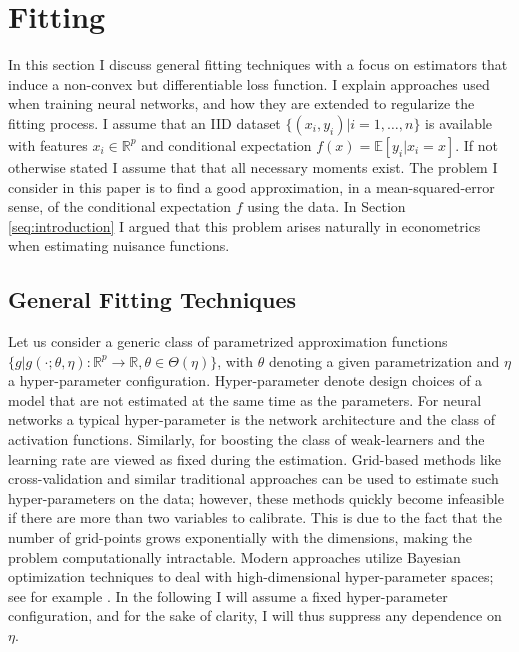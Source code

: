 \section{Fitting}
\label{seq:fitting}

In this section I discuss general fitting techniques with a focus on estimators that
induce a non-convex but differentiable loss function. I explain approaches used when
training neural networks, and how they are extended to regularize the fitting process. I
assume that an IID dataset $\{(x_i, y_i) | i = 1, \dots, n\}$ is available with features
$x_i \in \mathbb{R}^p$ and conditional expectation $f(x) = \mathbb{E}[y_i | x_i = x]$.
If not otherwise stated I assume that that all necessary moments exist. The problem I
consider in this paper is to find a good approximation, in a mean-squared-error sense,
of the conditional expectation $f$ using the data. In Section \ref{seq:introduction} I
argued that this problem arises naturally in econometrics when estimating nuisance
functions.

\subsection{General Fitting Techniques}

Let us consider a generic class of parametrized approximation functions $\{g | g(\cdot;
\theta, \eta) : \mathbb{R}^p \to \mathbb{R}, \theta \in \Theta(\eta)\}$, with $\theta$
denoting a given parametrization and $\eta$ a hyper-parameter configuration.
Hyper-parameter denote design choices of a model that are not estimated at the same time
as the parameters. For neural networks a typical hyper-parameter is the network
architecture and the class of activation functions. Similarly, for boosting the class of
weak-learners and the learning rate are viewed as fixed during the estimation.
Grid-based methods like cross-validation and similar traditional approaches can be used
to estimate such hyper-parameters on the data; however, these methods quickly become
infeasible if there are more than two variables to calibrate. This is due to the fact
that the number of grid-points grows exponentially with the dimensions, making the
problem computationally intractable. Modern approaches utilize Bayesian optimization
techniques to deal with high-dimensional hyper-parameter spaces; see for example
\cite{Snoek.2012}. In the following I will assume a fixed hyper-parameter configuration,
and for the sake of clarity, I will thus suppress any dependence on $\eta$.


